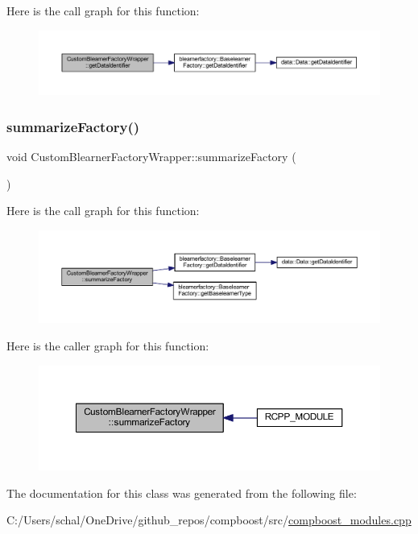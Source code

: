 Here is the call graph for this function\+:\nopagebreak
\begin{figure}[H]
\begin{center}
\leavevmode
\includegraphics[width=350pt]{class_custom_blearner_factory_wrapper_a67eba4cecf4cbde07ce5dca73a909f0f_cgraph}
\end{center}
\end{figure}
\mbox{\label{class_custom_blearner_factory_wrapper_a5247b68ba5b66b7ad70fc408b0c9da2c}} 
\subsubsection{\texorpdfstring{summarize\+Factory()}{summarizeFactory()}}
{\footnotesize\ttfamily void Custom\+Blearner\+Factory\+Wrapper\+::summarize\+Factory (\begin{DoxyParamCaption}{ }\end{DoxyParamCaption})\hspace{0.3cm}{\ttfamily [inline]}}

Here is the call graph for this function\+:\nopagebreak
\begin{figure}[H]
\begin{center}
\leavevmode
\includegraphics[width=350pt]{class_custom_blearner_factory_wrapper_a5247b68ba5b66b7ad70fc408b0c9da2c_cgraph}
\end{center}
\end{figure}
Here is the caller graph for this function\+:\nopagebreak
\begin{figure}[H]
\begin{center}
\leavevmode
\includegraphics[width=350pt]{class_custom_blearner_factory_wrapper_a5247b68ba5b66b7ad70fc408b0c9da2c_icgraph}
\end{center}
\end{figure}


The documentation for this class was generated from the following file\+:\begin{DoxyCompactItemize}
\item 
C\+:/\+Users/schal/\+One\+Drive/github\+\_\+repos/compboost/src/\mbox{\hyperlink{compboost__modules_8cpp}{compboost\+\_\+modules.\+cpp}}\end{DoxyCompactItemize}
